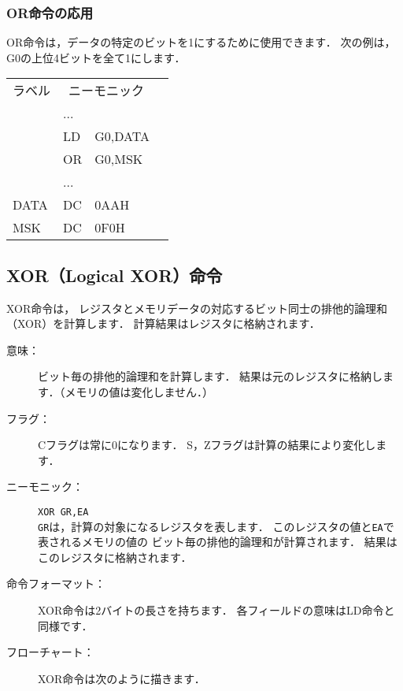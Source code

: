 \subsubsection{OR命令の応用}
OR命令は，データの特定のビットを1にするために使用できます．
次の例は，G0の上位4ビットを全て1にします．

{\ttfamily\small\begin{center}
  \begin{tabular}{|l|l l|l}
    \cline{1-3}
    ラベル & \multicolumn{2}{|c|}{ニーモニック} & \\
    \cline{1-3}
    & ...  &        & \\
    & LD   & G0,DATA& \\
    & OR   & G0,MSK & \\
    & ...  &        & \\
    DATA& DC   & 0AAH    & \\
    MSK & DC   & 0F0H    & \\
    \cline{1-3}
  \end{tabular}
\end{center}}

\begin{center}
\end{center}

\newpage
\subsection{XOR（Logical XOR）命令}
XOR命令は，
レジスタとメモリデータの対応するビット同士の排他的論理和（XOR）を計算します．
計算結果はレジスタに格納されます．

\begin{description}
\item[意味：]ビット毎の排他的論理和を計算します．
  結果は元のレジスタに格納します．（メモリの値は変化しません．）

\item[フラグ：]Cフラグは常に0になります．
  S，Zフラグは計算の結果により変化します．

\item[ニーモニック：]\texttt{XOR  GR,EA} \\
  \texttt{GR}は，計算の対象になるレジスタを表します．
  このレジスタの値と\texttt{EA}で表されるメモリの値の
  ビット毎の排他的論理和が計算されます．
  結果はこのレジスタに格納されます．

\item[命令フォーマット：]XOR命令は2バイトの長さを持ちます．
  各フィールドの意味はLD命令と同様です．


\item[フローチャート：]XOR命令は次のように描きます．

  \begin{center}
  \end{center}

\end{description}

